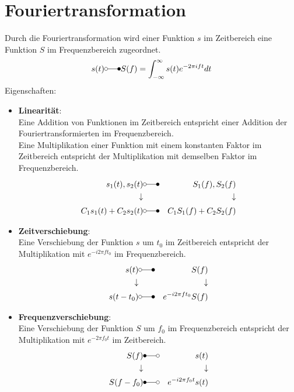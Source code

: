 \documentclass[12pt]{article}
\begin{document}
\section{Fouriertransformation}
Durch die Fouriertransformation wird einer Funktion $s$ im Zeitbereich eine Funktion $S$ im Frequenzbereich zugeordnet.
\begin{equation*}
	s(t)\laplace S(f)=\int_{-\infty}^\infty s(t)e^{-2\pi ift}dt
\end{equation*}
Eigenschaften:
\begin{itemize}
	\item \textbf{Linearität}:\\
			Eine Addition von Funktionen im Zeitbereich entspricht einer Addition der Fouriertransformierten im Frequenzbereich.\\
			Eine Multiplikation einer Funktion mit einem konstanten Faktor im Zeitbereich entspricht der Multiplikation mit demselben Faktor im Frequenzbereich.
			\begin{eqnarray*}
				s_1(t),s_2(t) & \laplace & S_1(f),S_2(f)\\
				\downarrow & & \downarrow \\
				C_1s_1(t)+C_2s_2(t) & \laplace & C_1S_1(f)+C_2S_2(f)
			\end{eqnarray*}
	\item \textbf{Zeitverschiebung}:\\
			Eine Verschiebung der Funktion $s$ um $t_0$ im Zeitbereich entspricht der Multiplikation mit $e^{-i2\pi ft_0}$ im Frequenzbereich.
			\begin{eqnarray*}
				s(t) & \laplace & S(f)\\
				\downarrow & & \downarrow \\
				s(t-t_0) & \laplace & e^{-i2\pi ft_0}S(f)
			\end{eqnarray*}
	\item \textbf{Frequenzverschiebung}:\\
			Eine Verschiebung der Funktion $S$ um $f_0$ im Frequenzbereich entspricht der Multiplikation mit $e^{-2\pi f_0 t}$ im Zeitbereich.
			\begin{eqnarray*}
				S(f) & \Laplace & s(t)\\
				\downarrow & & \downarrow \\
				S(f-f_0) & \Laplace & e^{-i2\pi f_0t}s(t)
			\end{eqnarray*}
\end{itemize}
\end{document}

